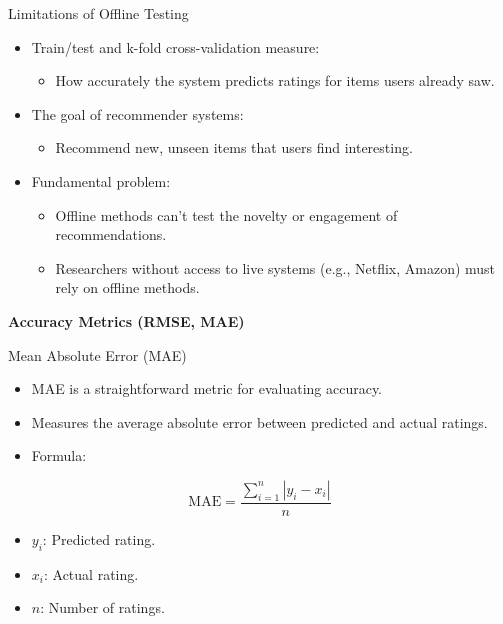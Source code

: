 \documentclass{beamer}
\begin{document}
\begin{frame}{Limitations of Offline Testing}
\begin{itemize}
    \item Train/test and k-fold cross-validation measure:
    \begin{itemize}
        \item How accurately the system predicts ratings for items users already saw.
    \end{itemize}
    \item The goal of recommender systems:
    \begin{itemize}
        \item Recommend new, unseen items that users find interesting.
    \end{itemize}
    \item Fundamental problem:
    \begin{itemize}
        \item Offline methods can’t test the novelty or engagement of recommendations.
        \item Researchers without access to live systems (e.g., Netflix, Amazon) must rely on offline methods.
    \end{itemize}
\end{itemize}
\end{frame}

\begin{frame}[plain]
    \begin{center}
        {\LARGE \textbf{Accuracy Metrics (RMSE, MAE)}}
    \end{center}
\end{frame}

\begin{frame}{Mean Absolute Error (MAE)}
\begin{itemize}
    \item MAE is a straightforward metric for evaluating accuracy.
    \item Measures the average absolute error between predicted and actual ratings.
    \item Formula:
\end{itemize}
\[
\text{MAE} = \frac{\sum_{i=1}^{n} \left| y_i - x_i \right|}{n}
\]
\begin{itemize}
    \item \( y_i \): Predicted rating.
    \item \( x_i \): Actual rating.
    \item \( n \): Number of ratings.
\end{itemize}
\end{frame}
\end{document}
